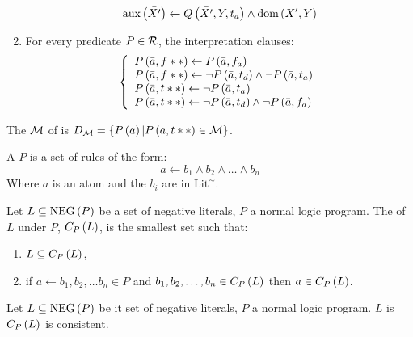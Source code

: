 \begin{defi}
\begin{enumerate}
\begin{equation}
{\ensuremath{\mbox{aux}\left(\bar{X'}\right)}\leftarrow\ensuremath{Q\left(\bar{X'},Y,t_a\right)}\wedge\ensuremath{\mbox{dom}\left(X',Y\right)}}
\end{equation}
\item For every predicate $P\in\mathcal{R}$, the interpretation clauses:
\begin{equation}
\left\{\begin{array}{l}P\left(\bar{a},f**\right)\leftarrow P\left(\bar{a},f_a\right)\\
P\left(\bar{a},f**\right)\leftarrow\neg P\left(\bar{a},t_d\right)\wedge\neg P\left(\bar{a},t_a\right)\\
P\left(\bar{a},t**\right)\leftarrow\neg P\left(\bar{a},t_a\right)\\
P\left(\bar{a},t**\right)\leftarrow\neg P\left(\bar{a},t_d\right)\wedge\neg P\left(\bar{a},f_a\right)\\
\end{array}\right.
\end{equation}
\end{enumerate}
\cite{conf/ijcai/BravoB03}
\end{defi}

\begin{defi}
The  $\mathcal{M}$ of  is $D_{\mathcal{M}}=\left\{ P\left(a\right)|P\left(a,t**\right)\in\mathcal{M}\right\}$.
\cite{conf/ijcai/BravoB03}
\end{defi}

\begin{defi}
A  $P$ is a set of rules of the form:
\begin{equation}
a\leftarrow b_1\wedge b_2\wedge\ldots\wedge b_n
\end{equation}
Where $a$ is an atom and the $b_i$ are in $\mbox{Lit}^{\sim}$.
\cite{conf/ijcai/BrewkaK93}
\end{defi}

\begin{defi}
Let $L\subseteq\mbox{NEG}\left(P\right)$ be a set of negative literals, $P$ a normal logic program. The  of $L$ under $P$, $C_P\left(L\right)$, is the smallest set such that:
\begin{enumerate}
 \item $L\subseteq C_P\left(L\right)$,
 \item if $a\leftarrow b_1,b_2,\ldots b_n\in P$ and $b_1,b_2,\ldots,b_n\in C_P\left(L\right)$ then $a\in C_P\left(L\right)$.
\end{enumerate}
\cite{conf/ijcai/BrewkaK93}
\end{defi}

\begin{defi}
Let $L\subseteq\mbox{NEG}\left(P\right)$ be it set of negative literals, $P$ a normal logic program. $L$ is  \iffTx{} $C_P\left(L\right)$ is consistent.
\cite{conf/ijcai/BrewkaK93}
\end{defi}

